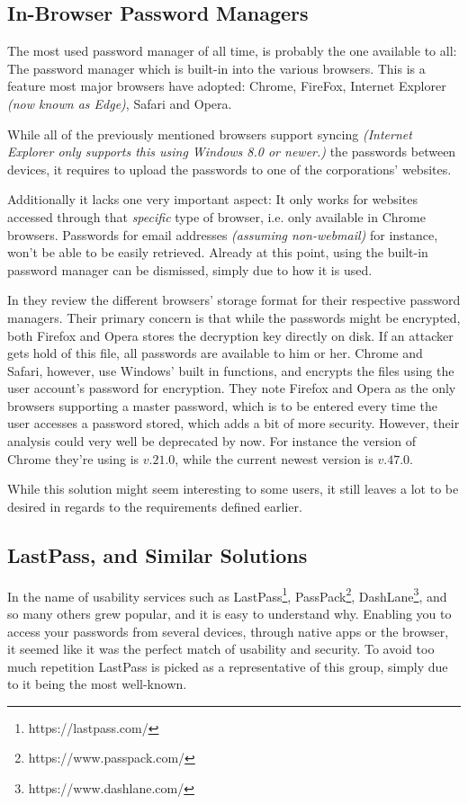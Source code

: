 		\subsection*{In-Browser Password Managers}
			\label{subsec:in-browser}
			The most used password manager of all time, is probably the one available to all: The password manager which is built-in into the various browsers. This is a feature most major browsers have adopted: Chrome, FireFox, Internet Explorer \emph{(now known as Edge)}, Safari and Opera.

			While all of the previously mentioned browsers support syncing \emph{(Internet Explorer only supports this using Windows 8.0 or newer.)} the passwords between devices, it requires to upload the passwords to one of the corporations' websites.

			Additionally it lacks one very important aspect: It only works for websites accessed through that \emph{specific} type of browser, i.e. only available in Chrome browsers. Passwords for email addresses  \emph{(assuming non-webmail)} for instance, won't be able to be easily retrieved. Already at this point, using the built-in password manager can be dismissed, simply due to how it is used.

			In \cite{browser_saved} they review the different browsers' storage format for their respective password managers. Their primary concern is that while the passwords might be encrypted, both Firefox and Opera stores the decryption key directly on disk. If an attacker gets hold of this file, all passwords are available to him or her. Chrome and Safari, however, use Windows' built in functions, and encrypts the files using the user account's password for encryption. They note Firefox and Opera as the only browsers supporting a master password, which is to be entered every time the user accesses a password stored, which adds a bit of more security. However, their analysis could very well be deprecated by now. For instance the version of Chrome they're using is $v. 21.0$, while the current newest version is $v. 47.0$. 

			While this solution might seem interesting to some users, it still leaves a lot to be desired in regards to the requirements defined earlier.

		\subsection*{LastPass, and Similar Solutions}
			\label{subsec:lastpass}
			In the name of usability services such as LastPass\footnote{https://lastpass.com/}, PassPack\footnote{https://www.passpack.com/}, DashLane\footnote{https://www.dashlane.com/}, and so many others grew popular, and it is easy to understand why. Enabling you to access your passwords from several devices, through native apps or the browser, it seemed like it was the perfect match of usability and security. To avoid too much repetition LastPass is picked as a representative of this group, simply due to it being the most well-known.

